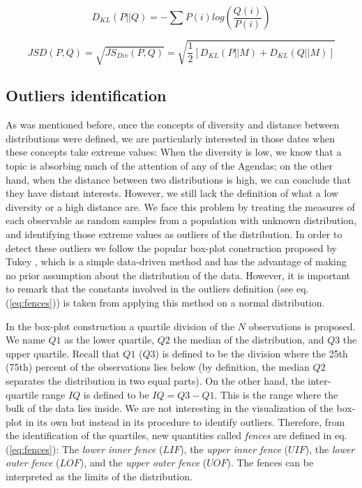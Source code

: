 \documentclass{bmcart}
\begin{document}
\begin{equation}
D_{KL}(P||Q) = -\sum{P(i) log(\frac{Q(i)}{P(i)})}
\label{eq:kl}
\end{equation}

\begin{equation}
\label{eq:jensen_shannon_distance}
JSD(P,Q) = \sqrt{JS_{Div}(P,Q)} = \sqrt{\frac{1}{2}[D_{KL}(P||M) + D_{KL}(Q||M)]} 
\label{eq:jensen_shannon_distance}
\end{equation}

\subsection*{Outliers identification}

\par As was mentioned before, once the concepts of diversity and distance between distributions were defined, we are particularly interested in those dates when these concepts take extreme values: When the diversity is low, we know that a topic is absorbing much of the attention of any of the Agendas; on the other hand, when the distance between two distributions is high, we can conclude that they have distant interests.
However, we still lack the definition of what a low diversity or a high distance are. 
We face this problem by treating the measures of each observable as random samples from a population with unknown distribution, and identifying those extreme values as outliers of the distribution. 
In order to detect these outliers we follow the popular box-plot construction proposed by Tukey \cite{tukey1977exploratory}, which is a simple data-driven method and has the advantage of making no prior assumption about the distribution of the data. 
However, it is important to remark that the constants involved in the outliers definition (see eq.(\ref{eq:fences})) is taken from applying this method on a normal distribution.
\par In the box-plot construction a quartile division of the $N$ observations is proposed. We name $Q1$ as the lower quartile, $Q2$ the median of the distribution, and $Q3$ the upper quartile. Recall that $Q1$ ($Q3$) is defined to be the division where the 25th (75th) percent of the observations lies below (by definition, the median $Q2$ separates the distribution in two equal parts). On the other hand, the inter-quartile range $IQ$ is defined to be $IQ = Q3 - Q1$. This is the range where the bulk of the data lies inside.
We are not interesting in the visualization of the box-plot in its own but instead in its procedure to identify outliers. Therefore, from the identification of the quartiles, new quantities called \emph{fences} are defined in eq.(\ref{eq:fences}): The \emph{lower inner fence} ($LIF$), the \emph{upper inner fence} ($UIF$), the \emph{lower outer fence} ($LOF$), and the \emph{upper outer fence} ($UOF$). The fences can be interpreted as the limits of the distribution.
\end{document}
